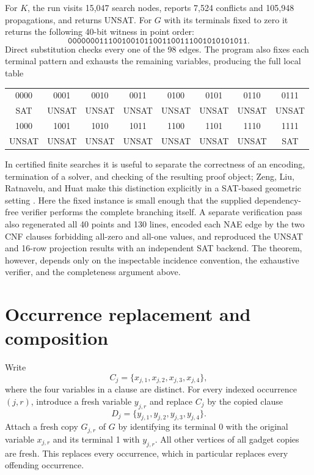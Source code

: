\documentclass[11pt]{article}
\theoremstyle{definition}
\begin{document}
For $K$, the run visits 15,047 search nodes, reports 7,524 conflicts and
105,948 propagations, and returns UNSAT.  For $G$ with its terminals fixed to
zero it returns the following 40-bit witness in point order:
\[
\texttt{0000000111001001011001100111001010101011}.
\]
Direct substitution checks every one of the 98 edges.  The program also fixes
each terminal pattern and exhausts the remaining variables, producing the
full local table
\begin{center}
\small
\begin{tabular}{@{}cccccccc@{}}
\toprule
0000 & 0001 & 0010 & 0011 & 0100 & 0101 & 0110 & 0111\\
SAT  & UNSAT& UNSAT& UNSAT& UNSAT& UNSAT& UNSAT& UNSAT\\
\midrule
1000 & 1001 & 1010 & 1011 & 1100 & 1101 & 1110 & 1111\\
UNSAT& UNSAT& UNSAT& UNSAT& UNSAT& UNSAT& UNSAT& SAT\\
\bottomrule
\end{tabular}
\end{center}

In certified finite searches it is useful to separate the correctness of an
encoding, termination of a solver, and checking of the resulting proof object;
Zeng, Liu, Ratnavelu, and Huat make this distinction explicitly in a SAT-based
geometric setting \cite[Sec.~1]{ZengEtAl2026}.  Here the fixed instance is
small enough that the supplied dependency-free verifier performs the complete
branching itself.  A separate verification pass also regenerated all 40
points and 130 lines, encoded each NAE edge by the two CNF clauses forbidding
all-zero and all-one values, and reproduced the UNSAT and 16-row projection
results with an independent SAT backend.  The theorem, however, depends only
on the inspectable incidence convention, the exhaustive verifier, and the
completeness argument above.

\section{Occurrence replacement and composition}

Write
\[
   C_j=\{x_{j,1},x_{j,2},x_{j,3},x_{j,4}\},
\]
where the four variables in a clause are distinct.  For every indexed
occurrence $(j,r)$, introduce a fresh variable $y_{j,r}$ and replace $C_j$ by
the copied clause
\[
   D_j=\{y_{j,1},y_{j,2},y_{j,3},y_{j,4}\}.
\]
Attach a fresh copy $G_{j,r}$ of $G$ by identifying its terminal 0 with the
original variable $x_{j,r}$ and its terminal 1 with $y_{j,r}$.  All other
vertices of all gadget copies are fresh.  This replaces every occurrence,
which in particular replaces every offending occurrence.
\end{document}
